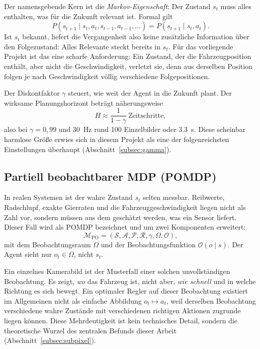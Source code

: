 Der namensgebende Kern ist die \emph{Markov-Eigenschaft}: Der Zustand $s_t$ muss alles enthalten, was für die Zukunft relevant ist. Formal gilt
\begin{equation}
  P(s_{t+1} \mid s_t, a_t, s_{t-1}, a_{t-1}, \dots) = P(s_{t+1} \mid s_t, a_t).
  \label{eq:markov}
\end{equation}
Ist $s_t$ bekannt, liefert die Vergangenheit also keine zusätzliche Information über den Folgezustand: Alles Relevante steckt bereits in $s_t$. Für das vorliegende Projekt ist das eine scharfe Anforderung: Ein Zustand, der die Fahrzeugposition enthält, aber nicht die Geschwindigkeit, verletzt sie, denn aus derselben Position folgen je nach Geschwindigkeit völlig verschiedene Folgepositionen.

Der Diskontfaktor $\gamma$ steuert, wie weit der Agent in die Zukunft plant. Der wirksame Planungshorizont beträgt näherungsweise
\begin{equation}
  H \approx \frac{1}{1 - \gamma}\ \text{Zeitschritte},
  \label{eq:horizont}
\end{equation}
also bei $\gamma = 0{,}99$ und \SI{30}{\hertz} rund \num{100} Einzelbilder oder \SI{3.3}{\second}. Diese scheinbar harmlose Größe erwies sich in diesem Projekt als eine der folgenreichsten Einstellungen überhaupt (Abschnitt~\ref{subsec:gamma}).

\subsection{Partiell beobachtbarer MDP (POMDP)}
\label{subsec:pomdp}

In realen Systemen ist der wahre Zustand $s_t$ selten messbar. Reibwerte, Radschlupf, exakte Gierraten und die Fahrzeuggeschwindigkeit liegen nicht als Zahl vor, sondern müssen aus dem geschätzt werden, was ein Sensor liefert. Dieser Fall wird als \acf{POMDP} bezeichnet und um zwei Komponenten erweitert:
\begin{equation}
  \mathcal{M}_{\text{PO}} = (\mathcal{S}, \mathcal{A}, \mathcal{P}, \mathcal{R}, \gamma, \Omega, \mathcal{O}),
  \label{eq:pomdp}
\end{equation}
mit dem Beobachtungsraum $\Omega$ und der Beobachtungsfunktion $\mathcal{O}(o \mid s)$. Der Agent sieht nur $o_t \in \Omega$, nicht $s_t$.

Ein einzelnes Kamerabild ist der Musterfall einer solchen unvollständigen Beobachtung. Es zeigt, \emph{wo} das Fahrzeug ist, nicht aber, \emph{wie schnell} und in welche Richtung es sich bewegt. Ein optimaler Regler auf dieser Beobachtung existiert im Allgemeinen nicht als einfache Abbildung $o_t \mapsto a_t$, weil derselben Beobachtung verschiedene wahre Zustände mit verschiedenen richtigen Aktionen zugrunde liegen können. Diese Mehrdeutigkeit ist kein technisches Detail, sondern die theoretische Wurzel des zentralen Befunds dieser Arbeit (Abschnitt~\ref{subsec:subpixel}).

